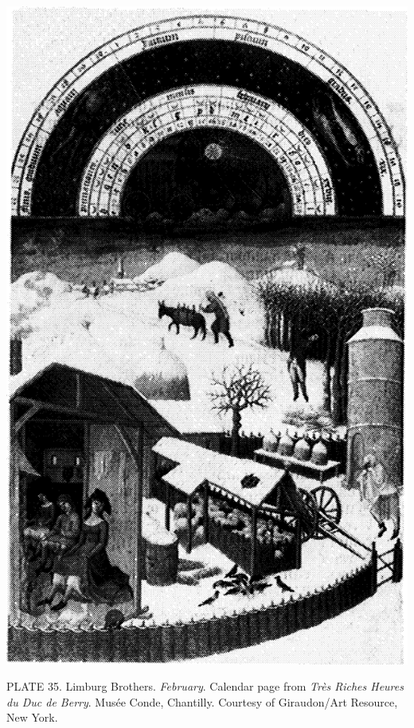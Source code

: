 \protect\hypertarget{20_ILLUSTRATIONS_FOLLOW_PAGE.xhtmlux5cux23id_2302}{}{}\includegraphics{include/html/images/350_2.png}

PLATE 35. Limburg Brothers. \emph{February}. Calendar page from
\emph{Très Riches Heures du Duc de Berry}. Musée Conde, Chantilly.
Courtesy of Giraudon/Art Resource, New York.

